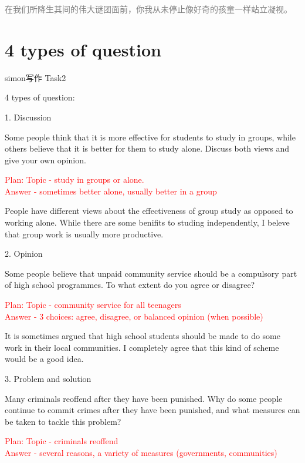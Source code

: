 \documentclass[12pt,a4paper]{article}
\newcommand{\textred}[1]{\textcolor{red}{#1}}  %
\begin{document}
{\lishu \textcolor{gray}{在我们所降生其间的伟大谜团面前，你我从未停止像好奇的孩童一样站立凝视。}\par}



\section{4 types of question}

{\large simon写作 Task2}

4 types of question:

1. Discussion

Some people think that it is more effective for students to study in groups, while others believe that it is better for them to study alone.
Discuss both views and give your own opinion.

{\small \textred{Plan: Topic - study in groups or alone.\\
\hspace*{4.4em} Answer - sometimes better alone, usually better in a group}}

People have different views about the effectiveness of group study as opposed to working alone.
While there are some benifits to studing independently, I beleve that group work is usually more productive.



2. Opinion

Some people believe that unpaid community service should be a compulsory part of high school programmes.
To what extent do you agree or disagree?

{\small \textred{Plan: Topic - community service for all teenagers\\
\hspace*{4.4em} Answer - 3 choices: agree, disagree, or balanced opinion (when possible)}}

It is sometimes argued that high school students should be made to do some work in their local communities. I completely agree that this kind of scheme would be a good idea.




3. Problem and solution

Many criminals reoffend after they have been punished. Why do some people continue to commit crimes after they have been punished, and what measures can be taken to tackle this problem?

{\small \textred{Plan:  Topic - criminals reoffend\\
\hspace*{4.4em} Answer - several reasons, a variety of measures (governments, communities)}}
\end{document}
